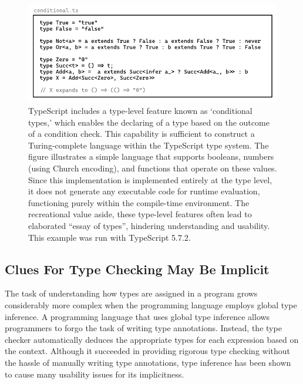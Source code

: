\begin{figure}[htbp]
  \centering
  \includegraphics[width=\linewidth]{Conditional}
  \caption[An example of encoding propositional logic operators and church numerals in  TypeScript's conditional types]{
    \label{fig:ts-conditional}
    TypeScript includes a type-level feature known as `conditional types,' which enables the declaring of a type based on the outcome of a condition check. This capability is sufficient to construct a Turing-complete language within the TypeScript type system. The figure illustrates a simple language that supports booleans, numbers (using Church encoding), and functions that operate on these values. Since this implementation is implemented entirely at the type level, it does not generate any executable code for runtime evaluation, functioning purely within the compile-time environment. The recreational value aside, these type-level features often lead to elaborated ``essay of types'', hindering understanding and usability. This example was run with TypeScript 5.7.2.
    }
\end{figure}

\subsection*{Clues For Type Checking May Be Implicit}

The task of understanding how types are assigned in a program grows considerably more complex when the programming language employs global type inference. A programming language that uses global type inference \cite{Damas1982-zw} allows programmers to forgo the task of writing type annotations. Instead, the type checker automatically deduces the appropriate types for each expression based on the context. Although it succeeded in providing rigorous type checking without the hassle of manually writing type annotations, type inference has been shown to cause many usability issues \cite{Jun2002-xp, Wand1986-lu} for its implicitness.  

